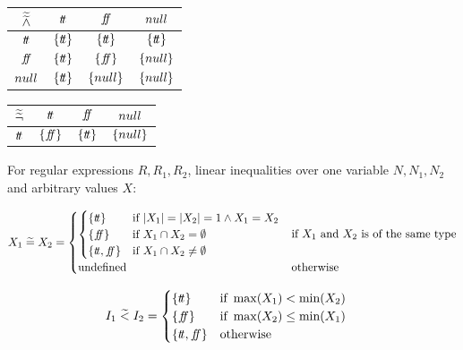 \begin{table}[H]
    \centering
    \begin{tabular}{c|ccc}
        $\widetilde{\widetilde{\land}}$ & $t\!t$ & $f\!\!f$ & $null$ \\
        \hline
        $t\!t$ & $\{t\!t\}$ & $\{t\!t\}$ & $\{t\!t\}$ \\
        $f\!\!f$ & $\{t\!t\}$ & $\{f\!\!f\}$ & $\{null\}$ \\
        $null$ & $\{t\!t\}$ & $\{null\}$ & $\{null\}$ \\
    \end{tabular}
    \label{tab:aaabland}
\end{table}

\begin{table}[H]
    \centering
    \begin{tabular}{c|ccc}
        $\widetilde{\widetilde{\neg}}$ & $t\!t$ & $f\!\!f$ & $null$ \\
        \hline
        $t\!t$ & $\{f\!\!f\}$ & $\{t\!t\}$ & $\{null\}$ \\
    \end{tabular}
    \label{tab:aaabneg}
\end{table}

For regular expressions $R, R_1, R_2$, linear inequalities over one variable $N, N_1, N_2$ and arbitrary values $X$:

\begin{align}
    X_1 \;\widetilde{=}\; X_2 &= \begin{cases}
        \begin{cases}
        \{t\!t \} & \text{if } |X_1| = |X_2| = 1 \land X_1 = X_2 \\
        \{f\!\!f\} & \text{if } X_1 \cap X_2 = \emptyset \\
        \{t\!t, f\!\!f\} & \text{if } X_1 \cap X_2 \neq \emptyset
        \end{cases} & \text{if $X_1$ and $X_2$ is of the same type} \\
        \text{undefined} & \text{otherwise}
    \end{cases} \\
\end{align}

\begin{align}
    I_1 \;\widetilde{<}\; I_2 &= \begin{cases}
        \{t\!t\} & \text{if } \max(X_1) < \min(X_2) \\
        \{f\!\!f\} & \text{if } \max(X_2) \leq \min (X_1) \\
        \{t\!t, f\!\!f\} & \text{otherwise}
    \end{cases}
\end{align}

